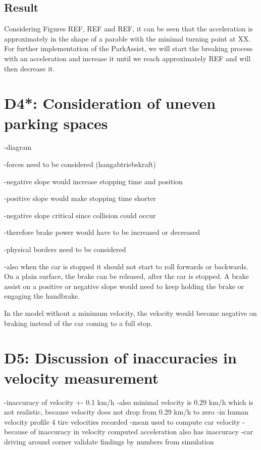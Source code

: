 \section{Result}
Considering Figures REF, REF and REF, it can be seen that the acceleration is approximately in the shape of a parable with the minimal turning point at XX. For further implementation of the ParkAssist, we will start the breaking process with an acceleration and increase it until we reach approximately REF and will then decrease it.

%
%
%

\chapter{D4*: Consideration of uneven parking spaces}\label{cha:D4}
-diagram

-forces need to be considered (hangabtriebskraft)

-negative slope would increase stopping time and position

-positive slope would make stopping time shorter

-negative slope critical since collision could occur

-therefore brake power would have to be increased or decreased

-physical borders need to be considered

-also when the car is stopped it should not start to roll forwards or backwards.
On a plain surface, the brake can be released, after the car is stopped.
A brake assist on a positive or negative slope would need to keep holding the brake or engaging the handbrake.

In the model without a minimum velocity, the velocity would become negative on braking instead of the car coming to a full stop.

\chapter{D5: Discussion of inaccuracies in velocity measurement}\label{cha:D5}
-inaccuracy of velocity +- 0.1 km/h
-also minimal velocity is 0.29 km/h which is not realistic, because velocity does not drop from 0.29 km/h to zero
-in human velocity profile 4 tire velocities recorded
-mean used to compute car velocity
-because of inaccuracy in velocity computed acceleration also has inaccuracy
-car driving around corner
validate findings by numbers from simulation

